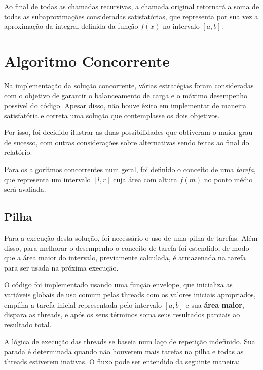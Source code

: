 \documentclass[11pt]{article}
\begin{document}
Ao final de todas as chamadas recursivas, a chamada original retornará a soma de todas as
subaproximações consideradas satisfatórias, que representa por sua vez a aproximação da integral
definida da função \(f(x)\) no intervalo \([a, b]\).

\section{Algoritmo Concorrente}
\label{sec:org27d69a8}
Na implementação da solução concorrente, várias estratégias foram consideradas com o objetivo
de garantir o balanceamento de carga e o máximo desempenho possível do código. Apesar disso,
não houve êxito em implementar de maneira satisfatória e correta uma solução que contemplasse
os dois objetivos.

Por isso, foi decidido ilustrar as duas possibilidades que obtiveram o maior grau
de sucesso, com outras considerações sobre alternativas sendo feitas ao final do relatório.

Para os algoritmos concorrentes num geral, foi definido o conceito de uma \emph{tarefa}, que representa
um intervalo \([l, r]\) cuja área com altura \(f(m)\) no ponto médio será avaliada.

\subsection{Pilha}
\label{sec:orgd9bc670}
Para a execução desta solução, foi necessário o uso de uma pilha de tarefas. Além disso,
para melhorar o desempenho o conceito de tarefa foi estendido, de modo que a área maior
do intervalo, previamente calculada, é armazenada na tarefa para ser usada na próxima
execução.

O código foi implementado usando uma função envelope, que inicializa as variáveis globais de
uso comum pelas threads com os valores iniciais apropriados, empilha a tarefa inicial
representada pelo intervalo \([a, b]\) e sua \textbf{área maior}, dispara as threads, e após os seus
términos soma seus resultados parciais ao resultado total.

A lógica de execução das threads se baseia num laço de repetição indefinido. Sua parada é
determinada quando não houverem mais tarefas na pilha e todas as threads estiverem inativas.
O fluxo pode ser entendido da seguinte maneira:
\end{document}
